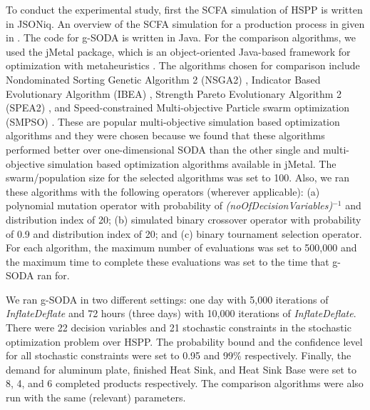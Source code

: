 \documentclass[a4paper, 12pt]{article} %
\begin{document}
To conduct the experimental study, first the SCFA simulation of HSPP is written in JSONiq. An overview of the SCFA simulation for a production process in given in \cite{GMU-CS-TR-2017-3}.  The code for g-SODA is written in Java. 
For the comparison algorithms, we used the jMetal package, which is an object-oriented Java-based framework for optimization with metaheuristics \cite{jMetal}. The algorithms chosen for comparison include Nondominated Sorting Genetic Algorithm 2 (NSGA2) \cite{ngsa2}, Indicator Based Evolutionary Algorithm (IBEA) \cite{ibea}, Strength Pareto Evolutionary Algorithm 2 (SPEA2) \cite{spea2}, and Speed-constrained Multi-objective Particle swarm optimization (SMPSO) \cite{NDG09}.
These are popular multi-objective simulation based optimization algorithms and they were chosen because we found that these algorithms performed better over one-dimensional SODA than the other single and multi-objective simulation based optimization algorithms available in jMetal. 
The swarm/population size for the selected algorithms was set to 100. Also, we ran these algorithms with the following operators (wherever applicable): (a) polynomial mutation operator with probability of \textit{(noOfDecisionVariables)}$^{-1}$ and distribution index of 20; (b) simulated binary crossover operator with probability of 0.9 and distribution index of 20; and (c) binary tournament selection operator. For each algorithm, the maximum number of evaluations was set to 500,000 and the maximum time to complete these evaluations was set to the time that g-SODA ran for.

We ran g-SODA in two different settings: one day with 5,000 iterations of \textit{InflateDeflate} and 72 hours (three days) with 10,000 iterations of \textit{InflateDeflate}. There were 22 decision variables and 21 stochastic constraints in the stochastic optimization problem over HSPP. The probability bound and the confidence level for all stochastic constraints were set to 0.95 and 99\% respectively. 
Finally, the demand for aluminum plate, finished Heat Sink, and Heat Sink Base were set to 8, 4, and 6 completed products respectively.
The comparison algorithms were also run with the same (relevant) parameters.
\end{document}

